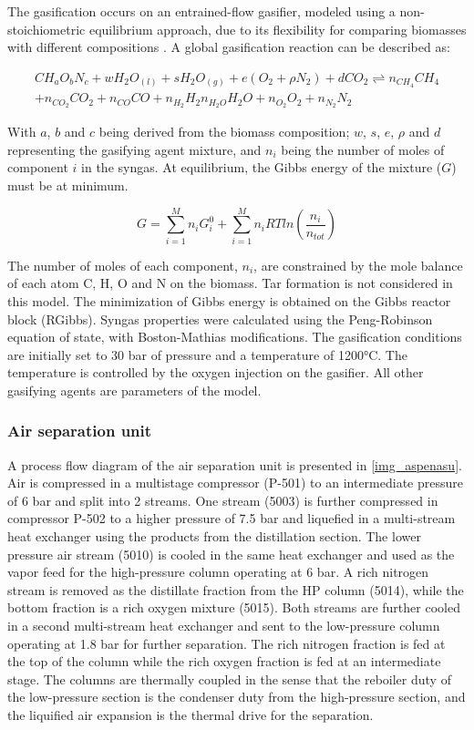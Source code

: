 \documentclass[a4paper, titlepage]{article}
\begin{document}
The gasification occurs on an entrained-flow gasifier, modeled using a non-stoichiometric equilibrium approach, 
due to its flexibility for comparing biomasses with different compositions 
\cite{gambarottaNonstoichiometricEquilibriumModel2018}. A global gasification reaction can be described as:

\begin{multline}
	CH_aO_bN_c + wH_2O_{(l)} + sH_2O_{(g)} + e(O_2+\rho N_2) + dCO_2 \rightleftharpoons n_{CH_4}CH_4 \\ 
	+ n_{CO_2}CO_2 + n_{CO}CO + n_{H_2}H_2 n_{H_2O}H_2O + n_{O_2}O_2 + n_{N_2}N_2
\end{multline}

With $a$, $b$ and $c$ being derived from the biomass composition; $w$, $s$, $e$, $\rho$ and $d$ representing the
gasifying agent mixture, and $n_i$ being the number of moles of component $i$ in the syngas. At equilibrium, the Gibbs
energy of the mixture ($G$) must be at minimum.

\begin{equation}
	G = \sum_{i=1}^{M}{n_iG_i^0} + \sum_{i=1}^{M}{n_iRT ln \left( \frac{n_i}{n_{tot}} \right) }
\end{equation}

The number of moles of each component, $n_i$, are constrained by the mole balance of each atom C, H, O and N on the
biomass. Tar formation is not considered in this model. The minimization of Gibbs energy is obtained on the Gibbs 
reactor block (RGibbs). Syngas properties were calculated using the Peng-Robinson equation of state, 
with Boston-Mathias modifications. The gasification conditions are initially set to 30 bar of pressure and a 
temperature of 1200°C.  The temperature is controlled by the oxygen injection on the gasifier. All other gasifying 
agents are parameters of the model.

\subsubsection{Air separation unit}

A process flow diagram of the air separation unit is presented in \autoref{img_aspenasu}. 
Air is compressed in a multistage compressor (P-501) to an intermediate pressure of 6 bar and split into 2 streams. 
One stream (5003) is further compressed in compressor P-502 to a higher pressure of 7.5 bar and liquefied in a 
multi-stream heat exchanger using the products from the distillation section. 
The lower pressure air stream (5010) is cooled in the same heat exchanger and used as the vapor feed for the 
high-pressure column operating at 6 bar.
A rich nitrogen stream is removed as the distillate fraction from the HP column (5014), while the bottom fraction is 
a rich oxygen mixture (5015). 
Both streams are further cooled in a second multi-stream heat exchanger and sent to the low-pressure column operating
at 1.8 bar for further separation. The rich nitrogen fraction is fed at the top of the column while the rich oxygen 
fraction is fed at an intermediate stage. The columns are thermally coupled in the sense that the reboiler duty of the
low-pressure section is the condenser duty from the high-pressure section, and the liquified air expansion is the 
thermal drive for the separation.
\end{document}
